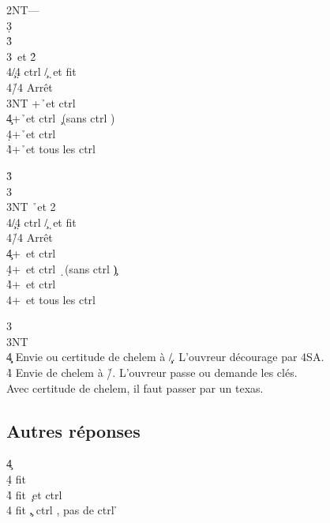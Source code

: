 \documentclass[a4paper]{article}
\begin{document}
\begin{bidtable}
2NT---\\
3\d\+\\
3\h {}\h \\
3\s {}\s\ et 2\h \+\\
4\c/4\d \> ctrl \c /\d\ et fit \s \\
4\h/4\s \> Arrêt\-\\
3NT +\h\ et ctrl \s \\
4\c {}+\h\ et ctrl \c\ (sans ctrl \s )\\
4\d {}+\h\ et ctrl \d \\
4\h {}+\h\ et tous les ctrl\-
\end{bidtable}

\begin{bidtable}
3\h\+\\
3\s {}\s \\
3NT \h\ et 2\s \+\\
4\c/4\d \> ctrl \c /\d\ et fit \h \\
4\h/4\s \> Arrêt\-\\
4\c {}+\s\ et ctrl \c \\
4\d {}+\s\ et ctrl \d\ (sans ctrl \c )\\
4\h {}+\s\ et ctrl \h \\
4\s {}+\s\ et tous les ctrl\-
\end{bidtable}

\begin{bidtable}
3\s\+\\
3NT\+\\
4\c\d \> Envie ou certitude de chelem à \c /\d . L'ouvreur décourage par 4SA.\\
4\h\s \> Envie de chelem à \h /\s . L'ouvreur passe ou demande les clés.\+\\
Avec \> certitude de chelem, il faut passer par un texas.\-\-\-
\end{bidtable}

\subsection{Autres réponses}

\begin{bidtable}
4\c\+\\
4\d \> fit \d \\
4\h \> fit \c\ et ctrl \h \\
4\s \> fit \c , ctrl \s , pas de ctrl \h \-
\end{bidtable}
\end{document}
